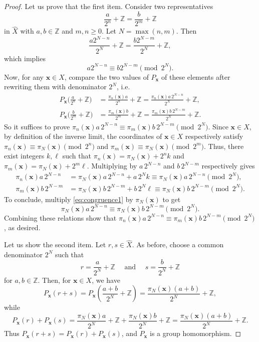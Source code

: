 \documentclass[10pt,a4paper]{amsart}
\newcommand{\Z}{\mathbb{Z}}
\begin{document}
\begin{proof}
Let us prove that the first item.  Consider two representatives 
\[
\frac{a}{2^n}+\mathbb Z=\frac{b}{2^m}+\mathbb Z
\]
in $\widehat X$ with $a,b\in\mathbb{Z}$ and $m,n\ge0$.
Let $N=\max(n,m)$.  Then
\[
\frac{a2^{N-n}}{2^N}+\mathbb Z
=\frac{b2^{N-m}}{2^N}+\mathbb Z,
\]
which implies
\begin{equation}\label{eq:congruence1}
a2^{N-n}\equiv b2^{N-m}\pmod{2^N}.
\end{equation}
Now,  for any $\mathbf{x}\in X$,  compare the two values of $P_\mathbf{x}$ of these elements after rewriting them with denominator $2^N$,  i.e.
\begin{align*}
P_\mathbf{x}\bigl(\tfrac{a}{2^n}+\mathbb{Z}\bigr)
&=
\frac{\pi_n(\mathbf{x})a}{2^n}+\mathbb Z
=
\frac{\pi_n(\mathbf{x})a\,2^{N-n}}{2^N}+\mathbb Z, \\
P_\mathbf{x}\bigl(\tfrac{b}{2^m}+\mathbb{Z}\bigr)
&=
\frac{\pi_m(\mathbf{x})b}{2^m}+\mathbb Z
=
\frac{\pi_m(\mathbf{x})b\,2^{N-m}}{2^N}+\mathbb Z.
\end{align*}
So it suffices to prove \(
\pi_n(\mathbf{x})a\,2^{N-n}\equiv \pi_m(\mathbf{x})b\,2^{N-m}\pmod{2^N}
\).
Since $\mathbf{x}\in X$, by definition of the inverse limit, the coordinates of $\mathbf{x}\in X$ respectively satisfy $\pi_n(\mathbf{x})\equiv \pi_N(\mathbf{x})\pmod{2^n}$ and $\pi_m(\mathbf{x})\equiv \pi_N(\mathbf{x})\pmod{2^m}$.
Thus,  there exist integers $k,\ell$ such that $\pi_n( \mathbf{x})=\pi_N(\mathbf{x})+2^n k$ and $\pi_m(\mathbf{x})=\pi_N(\mathbf{x})+2^m \ell$.
Multiplying by $a\, 2^{N-n}$ and $b\, 2^{N-m}$ respectively gives
\begin{align*}
\pi_n(\mathbf{x})a\,2^{N-n}&=\pi_N(\mathbf{x})a\,2^{N-n}+a\, 2^N k \equiv \pi_N(\mathbf{x})a \,2^{N-n}\pmod{2^N}, \\
\pi_m(\mathbf{x})b\,2^{N-m}&=\pi_N(\mathbf{x})b\,2^{N-m}+b\, 2^N \ell \equiv \pi_N(\mathbf{x})b\,2^{N-m}\pmod{2^N}.
\end{align*}
To conclude,  multiply \eqref{eq:congruence1} by $\pi_N(\mathbf{x})$ to get
\[
\pi_N(\mathbf{x})a\,2^{N-n}\equiv \pi_N(\mathbf{x})b\,2^{N-m}\pmod{2^N}.
\]
Combining these relations show that $\pi_n(\mathbf{x})a\,2^{N-n}\equiv \pi_m(\mathbf{x})b\,2^{N-m}\pmod{2^N}$,  as desired.


Let us show the second item. 
Let $r,s \in \widehat X$.  As before,  choose a common denominator $2^N$ such that
\[
r=\frac{a}{2^N}+\mathbb Z
\quad \text{ and } \quad
s=\frac{b}{2^N}+\mathbb Z
\]
for $a,b\in\Z$.
Then,  for $\mathbf{x}\in X$,  we have
\[
P_\mathbf{x}(r+s)
=P_\mathbf{x}\!\left(\frac{a+b}{2^N}+\mathbb Z\right)
=\frac{\pi_N(\mathbf{x})(a+b)}{2^N}+\mathbb Z,
\]
while
\[
P_\mathbf{x}(r)+P_\mathbf{x}(s)
=\frac{\pi_N(\mathbf{x})a}{2^N}+\mathbb Z
+\frac{\pi_N(\mathbf{x})b}{2^N}+\mathbb Z
=\frac{\pi_N(\mathbf{x})(a+b)}{2^N}+\mathbb Z.
\]
Thus $P_\mathbf{x}(r+s)=P_\mathbf{x}(r)+P_\mathbf{x}(s)$, and $P_\mathbf{x}$ is a group homomorphism.


\end{proof}
\end{document}

